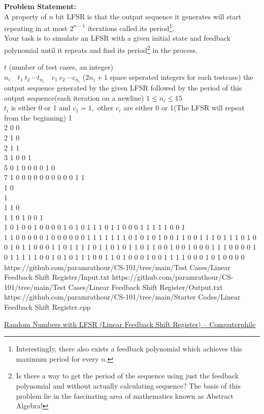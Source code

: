 \vspace{-2em}
\textbf{Problem Statement:}\\
A property of $n$ bit LFSR is that the output sequence it generates will start repeating in at most $2^{n-1}$ iterations called its period\footnote{Interestingly, there also exists a feedback polynomial which achieves this maximum period for every $n$.}.\\
Your task is to simulate an LFSR with a given initial state and feedback polynomial until it repeats and find its period\footnote{Is there a way to get the period of the sequence using just the feedback polynomial and without actually calculating sequence? The basis of this problem lie in the fascinating area of mathematics known as Abstract Algebra!
} in the process.
\begin{testcasesMore}
	{$t$ \hfill(number of test cases, an integer)\\
	$n_i\quad t_1\ t_2\ \cdots t_{n_i}\quad c_1\ c_2\ \cdots c_{n_i}$ \hfill($2n_i+1$ space seperated integers for each testcase)}
	{the output sequence generated by the given LFSR followed by the period of this output sequence\hfill(each iteration on a newline)}
	{$1 \leq n_i \leq 15$\\
	$t_i$ is either 0 or 1 and $c_1 = 1$\footnotemark,\ other $c_i$ are either 0 or 1\hfill(The LFSR will repeat from the beginning)}
	{1 \\2 0 0\\2  1  0\\2  1  1\\3  1 0  0 1\\5  0 1 0 0  0 0 1 0\\7  1 0 0 0 0 0  0 0 0 0 0 1}
	{1\\1 0\\1\\1 1 0\\1 1 0 1 0 0 1\\1 0 1 0 0 1 0 0 0 0 1 0 1 0 1 1 1 0 1 1 0 0 0 1 1 1 1 1 0 0 1\\1 1 0 0 0 0 0 1 0 0 0 0 0 0 1 1 1 1 1 1 1 0 1 0 1 0 1 0 0 1 1 0 0 1 1 1 0 1 1 1 0 1 0 0 1 0 1 1 0 0 0 1 1 0 1 1 1 1 0 1 1 0 1 0 1 1 0 1 1 0 0 1 0 0 1 0 0 0 1 1 1 0 0 0 0 1 0 1 1 1 1 1 0 0 1 0 1 0 1 1 1 0 0 1 1 0 1 0 0 0 1 0 0 1 1 1 1 0 0 0 1 0 1 0 0 0 0}
	{https://github.com/paramrathour/CS-101/tree/main/Test Cases/Linear Feedback Shift Register/Input.txt}
	{https://github.com/paramrathour/CS-101/tree/main/Test Cases/Linear Feedback Shift Register/Output.txt}
	{https://github.com/paramrathour/CS-101/tree/main/Starter Codes/Linear Feedback Shift Register.cpp}
\end{testcasesMore}
\begin{funvideo}
	\href{https://youtu.be/Ks1pw1X22y4}{Random Numbers with LFSR (Linear Feedback Shift Register) -- Computerphile}
\end{funvideo}
\recalctypearea